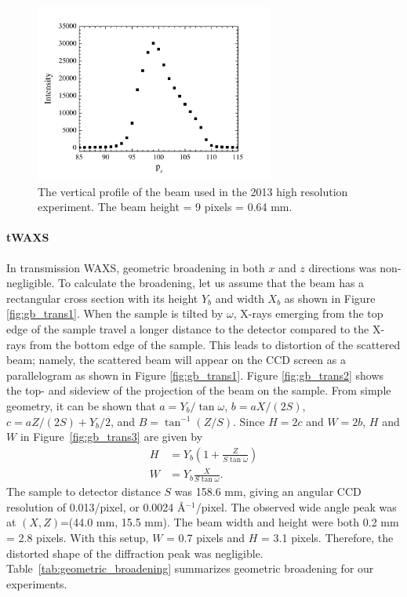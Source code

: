 \begin{figure}[htbp]
  \centering
  \includegraphics[width=0.7\textwidth]{figures/ripple/MMs/waxs/beamz_hr}
  \caption{The vertical profile of the beam used in the 2013 high resolution experiment.
  The beam height = 9 pixels = 0.64 mm.}
  \label{fig:nGIWAXS_beamz}
\end{figure} 

\paragraph{tWAXS}
In transmission WAXS, 
geometric broadening in both $x$ and $z$ directions was non-negligible.
To calculate the broadening, let us assume that the beam has a rectangular
cross section with its height $Y_b$ and width $X_b$ as shown in Figure 
\ref{fig:gb_trans1}. When the sample is tilted by $\omega$, X-rays emerging 
from the top edge of the sample travel a longer distance to the detector
compared to the X-rays from the bottom edge of the sample. 
This leads to 
distortion of the scattered beam; namely, the scattered beam will appear on 
the CCD screen as a parallelogram as shown in Figure 
\ref{fig:gb_trans1}. 
Figure \ref{fig:gb_trans2} shows the top- and sideview of the 
projection of the beam on the sample. From simple geometry, it can be shown 
that $a=Y_b/\tan\omega$, $b=aX/(2S)$, $c=aZ/(2S)+Y_b/2$, and $B=\tan^{-1}(Z/S)$. 
Since $H=2c$ and $W=2b$, $H$ and $W$ in Figure~\ref{fig:gb_trans3} are 
given by
\begin{align}
	H &= Y_b\left(1+\frac{Z}{S\tan\omega}\right)\\
	W &= Y_b\frac{X}{S\tan\omega}.
\end{align}
The sample to detector distance $S$ was 158.6 mm, giving an angular
CCD resolution of 0.013\textdegree/pixel, 
or 0.0024 \AA$^{-1}$/pixel.
The observed wide angle peak was at $(X,Z)$=(44.0 mm, 15.5 mm). 
The beam width and height were both 0.2 mm = 2.8 pixels.
With this setup, $W$ = 0.7 pixels and $H$ = 3.1 pixels. 
Therefore, the distorted shape of the diffraction peak was negligible.
Table~\ref{tab:geometric_broadening} summarizes geometric broadening for
our experiments.

